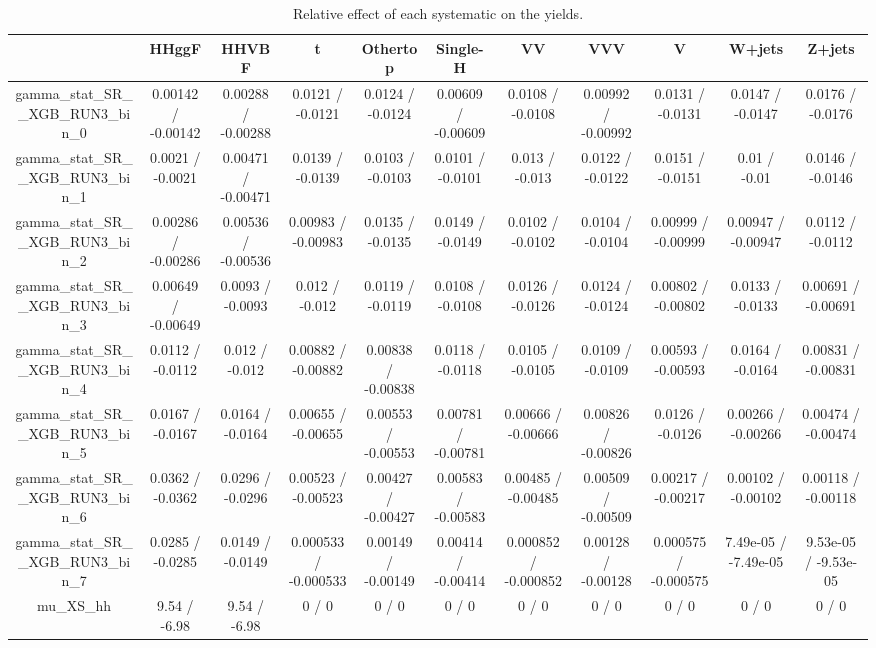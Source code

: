 \documentclass[10pt]{article}
\begin{document}
\begin{table}[htbp]
\begin{center}
\begin{tabular}{|c|c|c|c|c|c|c|c|c|c|c|}
\hline 
      & HHggF      & HHVBF      & t      & Othertop      & Single-H      & VV      & VVV      & V      & W+jets      & Z+jets \\ 
\hline 
  gamma_stat_SR__XGB_RUN3_bin_0 & 0.00142 / -0.00142 & 0.00288 / -0.00288 & 0.0121 / -0.0121 & 0.0124 / -0.0124 & 0.00609 / -0.00609 & 0.0108 / -0.0108 & 0.00992 / -0.00992 & 0.0131 / -0.0131 & 0.0147 / -0.0147 & 0.0176 / -0.0176 \\ 
  gamma_stat_SR__XGB_RUN3_bin_1 & 0.0021 / -0.0021 & 0.00471 / -0.00471 & 0.0139 / -0.0139 & 0.0103 / -0.0103 & 0.0101 / -0.0101 & 0.013 / -0.013 & 0.0122 / -0.0122 & 0.0151 / -0.0151 & 0.01 / -0.01 & 0.0146 / -0.0146 \\ 
  gamma_stat_SR__XGB_RUN3_bin_2 & 0.00286 / -0.00286 & 0.00536 / -0.00536 & 0.00983 / -0.00983 & 0.0135 / -0.0135 & 0.0149 / -0.0149 & 0.0102 / -0.0102 & 0.0104 / -0.0104 & 0.00999 / -0.00999 & 0.00947 / -0.00947 & 0.0112 / -0.0112 \\ 
  gamma_stat_SR__XGB_RUN3_bin_3 & 0.00649 / -0.00649 & 0.0093 / -0.0093 & 0.012 / -0.012 & 0.0119 / -0.0119 & 0.0108 / -0.0108 & 0.0126 / -0.0126 & 0.0124 / -0.0124 & 0.00802 / -0.00802 & 0.0133 / -0.0133 & 0.00691 / -0.00691 \\ 
  gamma_stat_SR__XGB_RUN3_bin_4 & 0.0112 / -0.0112 & 0.012 / -0.012 & 0.00882 / -0.00882 & 0.00838 / -0.00838 & 0.0118 / -0.0118 & 0.0105 / -0.0105 & 0.0109 / -0.0109 & 0.00593 / -0.00593 & 0.0164 / -0.0164 & 0.00831 / -0.00831 \\ 
  gamma_stat_SR__XGB_RUN3_bin_5 & 0.0167 / -0.0167 & 0.0164 / -0.0164 & 0.00655 / -0.00655 & 0.00553 / -0.00553 & 0.00781 / -0.00781 & 0.00666 / -0.00666 & 0.00826 / -0.00826 & 0.0126 / -0.0126 & 0.00266 / -0.00266 & 0.00474 / -0.00474 \\ 
  gamma_stat_SR__XGB_RUN3_bin_6 & 0.0362 / -0.0362 & 0.0296 / -0.0296 & 0.00523 / -0.00523 & 0.00427 / -0.00427 & 0.00583 / -0.00583 & 0.00485 / -0.00485 & 0.00509 / -0.00509 & 0.00217 / -0.00217 & 0.00102 / -0.00102 & 0.00118 / -0.00118 \\ 
  gamma_stat_SR__XGB_RUN3_bin_7 & 0.0285 / -0.0285 & 0.0149 / -0.0149 & 0.000533 / -0.000533 & 0.00149 / -0.00149 & 0.00414 / -0.00414 & 0.000852 / -0.000852 & 0.00128 / -0.00128 & 0.000575 / -0.000575 & 7.49e-05 / -7.49e-05 & 9.53e-05 / -9.53e-05 \\ 
  mu_XS_hh & 9.54 / -6.98 & 9.54 / -6.98 & 0 / 0 & 0 / 0 & 0 / 0 & 0 / 0 & 0 / 0 & 0 / 0 & 0 / 0 & 0 / 0 \\ 
\hline 
\end{tabular} 
\caption{Relative effect of each systematic on the yields.} 
\end{center} 
\end{table} 
\end{document}
